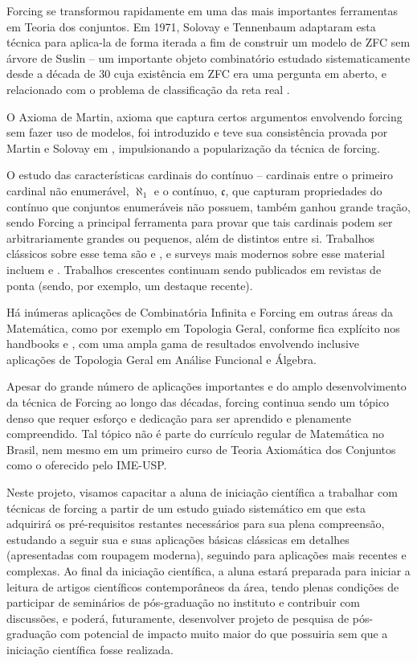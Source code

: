 \documentclass{article}
\begin{document}
    Forcing se transformou rapidamente em uma das mais importantes ferramentas em Teoria dos conjuntos.
    Em 1971, Solovay e Tennenbaum \cite{solovay1971iterated} adaptaram esta técnica para aplica-la de forma iterada a fim de construir um modelo de ZFC sem árvore de Suslin -- um importante objeto combinatório estudado sistematicamente desde a década de 30 cuja existência em ZFC era uma pergunta em aberto, e relacionado com o problema de classificação da reta real \cite{kurepa1935ensembles}.

    O Axioma de Martin, axioma que captura certos argumentos envolvendo forcing sem fazer uso de modelos, foi introduzido e teve sua consistência provada por Martin e Solovay em \cite{martin1970internal}, impulsionando a popularização da técnica de forcing.

    O estudo das características cardinais do contínuo -- cardinais entre o primeiro cardinal não enumerável, $\aleph_1$ e o contínuo, $\mathfrak c$, que capturam propriedades do contínuo que conjuntos enumeráveis não possuem, também ganhou grande tração, sendo Forcing a principal ferramenta para provar que tais cardinais podem ser arbitrariamente grandes ou pequenos, além de distintos entre si.
    Trabalhos clássicos sobre esse tema são \cite{bartoszynski1993chichon} e \cite{miller1981some}, e surveys mais modernos sobre esse material incluem \cite{blass2009combinatorial} e \cite{douwen1984integers}. Trabalhos crescentes continuam sendo publicados em revistas de ponta (sendo, por exemplo, \cite{goldstern2019chichon} um destaque recente).

    Há inúmeras aplicações de Combinatória Infinita e Forcing em outras áreas da Matemática, como por exemplo em Topologia Geral, conforme fica explícito nos handbooks \cite{kunen1984handbook} e \cite{foreman2009handbook}, com uma ampla gama de resultados envolvendo inclusive aplicações de Topologia Geral em Análise Funcional e Álgebra.

    Apesar do grande número de aplicações importantes e do amplo desenvolvimento da técnica de Forcing ao longo das décadas, forcing continua sendo um tópico denso que requer esforço e dedicação para ser aprendido e plenamente compreendido. Tal tópico não é parte do currículo regular de Matemática no Brasil, nem mesmo em um primeiro curso de Teoria Axiomática dos Conjuntos como o oferecido pelo IME-USP.

    Neste projeto, visamos capacitar a aluna de iniciação científica a trabalhar com técnicas de forcing a partir de um estudo guiado sistemático em que esta adquirirá os pré-requisitos restantes necessários para sua plena compreensão, estudando a seguir sua e suas aplicações básicas clássicas em detalhes (apresentadas com roupagem moderna), seguindo para aplicações mais recentes e complexas.
    Ao final da iniciação científica, a aluna estará preparada para iniciar a leitura de artigos científicos contemporâneos da área, tendo plenas condições de participar de seminários de pós-graduação no instituto e contribuir com discussões, e poderá, futuramente, desenvolver projeto de pesquisa de pós-graduação com potencial de impacto muito maior do que possuiria sem que a iniciação científica fosse realizada.
\end{document}
